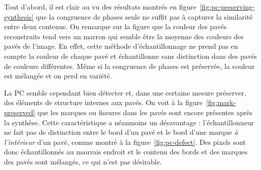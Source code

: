 \bigskip

Tout d'abord, il est clair au vu des résultats montrés en figure~\ref{fig:pc-preserving-synthesis} que la congruence de phases seule ne suffit pas à capturer la similarité entre deux contenus. On remarque sur la figure que la couleur des pavés reconstruits tend vers un marron qui semble être la moyenne des couleurs des pavés de l'image. En effet, cette méthode d'échantillonnage ne prend pas en compte la couleur de chaque pavé et échantillonne sans distinction dans des pavés de couleurs différentes. Même si la congruence de phases est préservée, la couleur est mélangée et on perd en variété.

\bigskip

La PC semble cependant bien détecter et, dans une certaine mesure préserver, des éléments de structure internes aux pavés. On voit à la figure~\ref{fig:mark-preserved} que les marques ou fissures dans les pavés sont encore présentes après la synthèse. Cette caractéristique a néanmoins un désavantage : l'échantillonneur ne fait pas de distinction entre le bord d'un pavé et le bord d'une marque \textit{à l'intérieur} d'un pavé, comme montré à la figure~\ref{fig:pc-defect}. Des pixels sont donc échantillonnés au mauvais endroit et le contenu des bords et des marques des pavés sont mélangés, ce qui n'est pas désirable.

\bigskip

